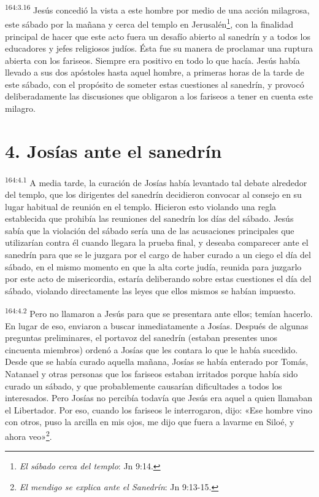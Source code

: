 \par 
\textsuperscript{164:3.16} Jesús concedió la vista a este hombre por medio de una acción milagrosa, este sábado por la mañana y cerca del templo en Jerusalén\footnote{\textit{El sábado cerca del templo}: Jn 9:14.}, con la finalidad principal de hacer que este acto fuera un desafío abierto al sanedrín y a todos los educadores y jefes religiosos judíos. Ésta fue su manera de proclamar una ruptura abierta con los fariseos. Siempre era positivo en todo lo que hacía. Jesús había llevado a sus dos apóstoles hasta aquel hombre, a primeras horas de la tarde de este sábado, con el propósito de someter estas cuestiones al sanedrín, y provocó deliberadamente las discusiones que obligaron a los fariseos a tener en cuenta este milagro.

\section*{4. Josías ante el sanedrín}
\par 
\textsuperscript{164:4.1} A media tarde, la curación de Josías había levantado tal debate alrededor del templo, que los dirigentes del sanedrín decidieron convocar al consejo en su lugar habitual de reunión en el templo. Hicieron esto violando una regla establecida que prohibía las reuniones del sanedrín los días del sábado. Jesús sabía que la violación del sábado sería una de las acusaciones principales que utilizarían contra él cuando llegara la prueba final, y deseaba comparecer ante el sanedrín para que se le juzgara por el cargo de haber curado a un ciego el día del sábado, en el mismo momento en que la alta corte judía, reunida para juzgarlo por este acto de misericordia, estaría deliberando sobre estas cuestiones el día del sábado, violando directamente las leyes que ellos mismos se habían impuesto.

\par 
\textsuperscript{164:4.2} Pero no llamaron a Jesús para que se presentara ante ellos; temían hacerlo. En lugar de eso, enviaron a buscar inmediatamente a Josías. Después de algunas preguntas preliminares, el portavoz del sanedrín (estaban presentes unos cincuenta miembros) ordenó a Josías que les contara lo que le había sucedido. Desde que se había curado aquella mañana, Josías se había enterado por Tomás, Natanael y otras personas que los fariseos estaban irritados porque había sido curado un sábado, y que probablemente causarían dificultades a todos los interesados. Pero Josías no percibía todavía que Jesús era aquel a quien llamaban el Libertador. Por eso, cuando los fariseos le interrogaron, dijo: «Ese hombre vino con otros, puso la arcilla en mis ojos, me dijo que fuera a lavarme en Siloé, y ahora veo»\footnote{\textit{El mendigo se explica ante el Sanedrín}: Jn 9:13-15.}.

